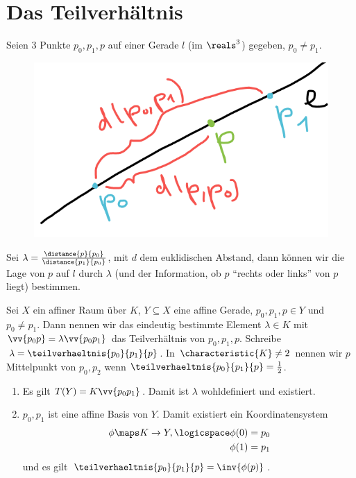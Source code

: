 \section{Das Teilverhältnis}
\begin{idee*}
    Seien 3 Punkte \( p_0,p_1,p \) auf einer Gerade \( l \) (\zb im \( \reals^3 \)) gegeben, \( p_0\neq p_1 \).
    \begin{figure}[H]
        \centering
        \includegraphics[width=0.5\linewidth]{figures/gerade_teilverhaeltnis}
        \caption*{}
        \label{fig:gerade_teilverhaeltnis}
    \end{figure}
    Sei \( \lambda=\frac{\distance{p}{p_0}}{\distance{p_1}{p_0}} \), mit \( d \) dem euklidischen Abstand, dann können wir die Lage von \( p \) auf \( l \) durch \( \lambda \) (und der Information, ob \( p \) \enquote{rechts oder links} von \( p \) liegt) bestimmen.
\end{idee*}
\begin{definition*}
    Sei \( X \) ein affiner Raum über \( K \), \( Y\subseteq X \) eine affine Gerade, \( p_0,p_1,p\in Y \) und \( p_0\neq p_1 \). Dann nennen wir das eindeutig bestimmte Element \( \lambda\in K \) mit \( \vv{p_0 p}=\lambda \vv{p_0 p_1} \) das Teilverhältnis von \( p_0,p_1,p \). Schreibe \( \lambda=\teilverhaeltnis{p_0}{p_1}{p} \). In \( \characteristic{K}\neq 2 \) nennen wir \( p \) Mittelpunkt von \( p_0,p_2 \) wenn \( \teilverhaeltnis{p_0}{p_1}{p}=\frac{1}{2} \).
\end{definition*}
\begin{bemerkungen*}
    \begin{enumerate}
        \item Es gilt \( T(Y)=K\vv{p_0p_1} \). Damit ist \( \lambda \) wohldefiniert und existiert.
        \item \( p_0,p_1 \) ist eine affine Basis von \( Y \). Damit existiert ein Koordinatensystem
        \begin{align*}
            \phi\maps K\to Y,\logicspace \begin{aligned}[t]
                \phi(0)&=p_0\\
                \phi(1)&=p_1
            \end{aligned}
        \end{align*}
        und es gilt \( \teilverhaeltnis{p_0}{p_1}{p}=\inv{\phi(p)} \).
    \end{enumerate}
    
\end{bemerkungen*}
